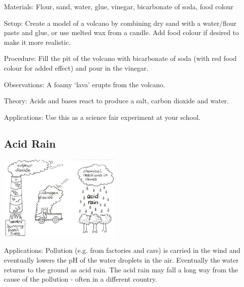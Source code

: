 \begin{multicols}{2}
\begin{description*}
\item[Materials:]{Flour, sand, water, glue, vinegar, bicarbonate of soda, food colour}
\item[Setup:]{Create a model of a volcano by combining dry sand with a water/flour paste and glue, or use melted wax from a candle. Add food colour if desired to make it more realistic.}
\item[Procedure:]{Fill the pit of the volcano with bicarbonate of soda (with red food colour for added effect) and pour in the vinegar.}
\item[Observations:]{A foamy `lava' erupts from the volcano.}
\item[Theory:]{Acids and bases react to produce a salt, carbon dioxide and water.}
\item[Applications:]{Use this as a science fair experiment at your school.}
\end{description*}

\subsection{Acid Rain}

\begin{center}
\includegraphics[width=0.45\textwidth]{./img/vso/acid-rain.jpg}
\end{center}

\begin{description*}
\item[Applications:]{Pollution (e.g. from factories and cars) is carried in the wind and eventually lowers the pH of the water droplets in the air. Eventually the water returns to the ground as acid rain. The acid rain may fall a long way from the cause of the pollution - often in a different country.}
\end{description*}


\end{multicols}
